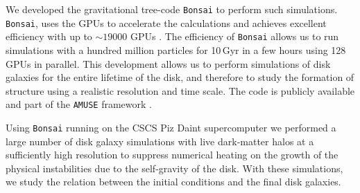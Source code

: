 We developed the gravitational tree-code {\tt Bonsai} to perform such
simulations.  {\tt Bonsai}, uses the GPUs to accelerate the
calculations and achieves excellent efficiency with up to $\sim 19000$
GPUs \citep{2012JCoPh.231.2825B,2014hpcn.conf...54B}.  The efficiency
of {\tt Bonsai} allows us to run simulations with a hundred million
particles for 10\,Gyr in a few hours using 128 GPUs in parallel.  This
development allows us to perform simulations of disk galaxies for the
entire lifetime of the disk, and therefore to study the formation of
structure using a realistic resolution and time scale. The code is
publicly available and part of the {\tt AMUSE} framework
\citep{AMUSE}.

Using {\tt Bonsai} running on the CSCS Piz Daint supercomputer we
performed a large number of disk galaxy simulations with live
dark-matter halos at a sufficiently high resolution to suppress
numerical heating on the growth of the physical instabilities due to
the self-gravity of the disk.  With these simulations, we study the
relation between the initial conditions and the final disk galaxies.





